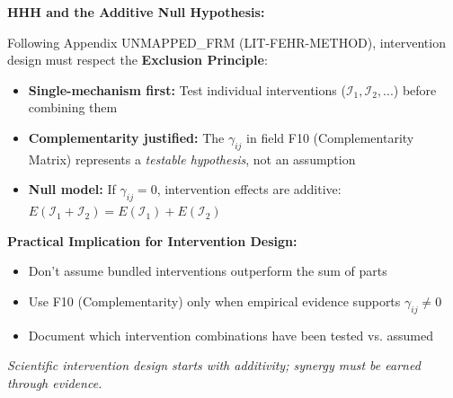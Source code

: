 \begin{tcolorbox}[colback=red!5!white, colframe=red!75!black,
    title=\textbf{Methodological Note: Exclusion Principle (Appendix UNMAPPED_FRM)}]

\textbf{HHH and the Additive Null Hypothesis:}

Following Appendix UNMAPPED_FRM (LIT-FEHR-METHOD), intervention design must respect the \textbf{Exclusion Principle}:

\begin{itemize}[nosep]
    \item \textbf{Single-mechanism first:} Test individual interventions ($\mathcal{I}_1, \mathcal{I}_2, ...$) before combining them
    \item \textbf{Complementarity justified:} The $\gamma_{ij}$ in field F10 (Complementarity Matrix) represents a \textit{testable hypothesis}, not an assumption
    \item \textbf{Null model:} If $\gamma_{ij} = 0$, intervention effects are additive: $E(\mathcal{I}_1 + \mathcal{I}_2) = E(\mathcal{I}_1) + E(\mathcal{I}_2)$
\end{itemize}

\medskip
\textbf{Practical Implication for Intervention Design:}
\begin{itemize}[nosep]
    \item Don't assume bundled interventions outperform the sum of parts
    \item Use F10 (Complementarity) only when empirical evidence supports $\gamma_{ij} \neq 0$
    \item Document which intervention combinations have been tested vs. assumed
\end{itemize}

\textit{Scientific intervention design starts with additivity; synergy must be earned through evidence.}
\end{tcolorbox}



